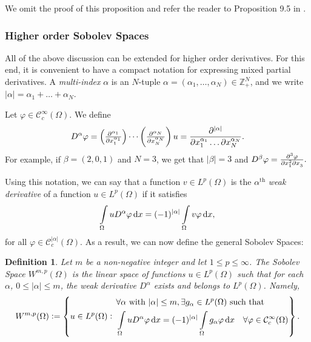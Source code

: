 \documentclass[a4paper,doc,11pt]{article}
\newtheorem{definition}[theorem]{Definition}
\newcommand{\Z}{\mathbb{Z}}
\newcommand{\CC}{\mathcal{C}}
\begin{document}
We omit the proof of this proposition and refer the reader to Proposition 9.5 in \citep{Brezis2010}.

\subsubsection{Higher order Sobolev Spaces}

All of the above discussion can be extended for higher order derivatives. For this end, it is convenient to have a compact notation for expressing mixed partial derivatives. A \emph{multi-index} \(\alpha\) is an \(N\)-tuple \( \alpha = (\alpha_1, \ldots, \alpha_N) \in \Z^N_+\), and we write \(|\alpha| = \alpha_1 + \ldots + \alpha_N\). 

Let \( \varphi \in \CC_c^\infty (\Omega)\). We define 
\[
    D^\alpha \varphi = \left( \pd[\alpha_1]{ }{x_1} \right) \cdots \left( \pd[\alpha_N]{ }{x_N} \right) u = \frac{\partial^{|\alpha|}}{ \partial x_1^{\alpha_1} \ldots \partial x_N^{\alpha_N} }.
\]
For example, if \(\beta = (2,0,1)\) and \(N = 3\), we get that \( |\beta| = 3\) and
\(
    D^\beta \varphi = \md{\varphi}{3}{x_1}{2}{x_3}{}.
\)

Using this notation, we can say that a function \( v \in L^{p}(\Omega)\) is the \( \alpha^\text{th}\) \emph{weak derivative} of a function \(u \in L^p(\Omega)\) if it satisfies
\[
    \int\limits_\Omega u D^\alpha \varphi \dif x = (-1)^{|\alpha|} \int\limits_\Omega v \varphi \dif x,
\]
for all \(\varphi \in \CC_c^{|\alpha|} (\Omega)\). As a result, we can now define the general Sobolev Spaces:

\begin{definition}
Let \(m\) be a non-negative integer and let \( 1\leq p \leq \infty\). The Sobolev Space \(W^{m,p} (\Omega)\) is the linear space of functions \( u \in L^p (\Omega)\) such that for each \(\alpha\), \(0 \leq |\alpha| \leq m\), the weak derivative \(D^\alpha\) exists and belongs to \(L^p (\Omega)\). Namely,
\[
    W^{m,p} (\Omega) :=
    \left\{
        u \in L^p (\Omega): \,
        \begin{aligned}
        &\forall \alpha \text{ with } |\alpha| \leq m, \exists g_{\alpha} \in L^p (\Omega) \text{ such that } 
        \\
        &\int\limits_\Omega u D^\alpha \varphi \dif x = (-1)^{|\alpha|}\int\limits_\Omega g_\alpha \varphi \dif x \quad \forall \varphi \in \CC_c^\infty (\Omega)
        \end{aligned}
    \right\}.
\]
\end{definition}
\end{document}
